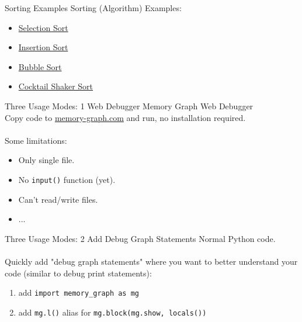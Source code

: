 \documentclass[10pt, colorlinks=true, urlcolor=blue]{beamer}
\newcommand{\listfile}[2][]{
  \begin{tcolorbox}[
      title=#2,
      fonttitle=\tiny,
      boxsep=0pt,
      top=2pt,
      bottom=2pt,
      left=1pt,
      right=0pt,
      toptitle=0mm,
      bottomtitle=0mm,
      halign title=center,
      box align = center,
      nobeforeafter]
      \inputminted[#1]{python}{#2}\end{tcolorbox}
}
\begin{document}
\begin{frame}{Sorting Examples}
Sorting (Algorithm) Examples:
\begin{itemize}
  \item \href{https://memory-graph.com/\#codeurl=https://raw.githubusercontent.com/bterwijn/memory_graph/refs/heads/main/src/selection_sort.py&breakpoints=13,27&continues=1&timestep=0.2}{Selection Sort}
  \item \href{https://memory-graph.com/\#codeurl=https://raw.githubusercontent.com/bterwijn/memory_graph/refs/heads/main/src/insertion_sort.py&breakpoints=13,29&continues=1&timestep=0.2}{Insertion Sort}
  \item \href{https://memory-graph.com/\#codeurl=https://raw.githubusercontent.com/bterwijn/memory_graph/refs/heads/main/src/bubble_sort.py&breakpoints=29,38&continues=1&timestep=0.2}{Bubble Sort}
  \item \href{https://memory-graph.com/\#codeurl=https://raw.githubusercontent.com/bterwijn/memory_graph/refs/heads/main/src/cocktail_sort.py&breakpoints=16,45&continues=1&timestep=0.2}{Cocktail Shaker Sort}
\end{itemize}
\end{frame}

\begin{frame}{Three Usage Modes: 1 Web Debugger}
  Memory Graph Web Debugger \\
  Copy code to \href{https://memory-graph.com/}{memory-graph.com} and run, no installation required. \\
  \\
  Some limitations:
  \begin{itemize}
    \item Only single file.
    \item No \texttt{input()} function (yet).
    \item Can't read/write files.
    \item ...
  \end{itemize}
\end{frame}

\begin{frame}[fragile]{Three Usage Modes: 2 Add Debug Graph Statements}
  Normal Python code.\\
  \\
  Quickly add "debug graph statements" where you want to better understand your code (similar to debug print statements):
  \begin{enumerate}
    \item add \texttt{import memory_graph as mg}
    \item add \texttt{mg.l()} alias for \texttt{mg.block(mg.show, locals())}
  \end{enumerate}
  \vspace{1em}
  \listfile[fontsize=\scriptsize,baselinestretch=1.4]{src/my\string_list.py}
\end{frame}
\end{document}
